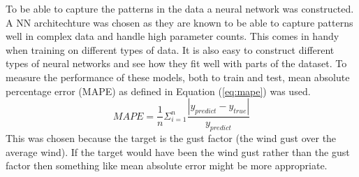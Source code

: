 To be able to capture the patterns in the data a neural network was constructed. A NN architechture was chosen as they are known to be able to capture patterns well in complex data and handle high parameter counts. This comes in handy when training on different types of data. It is also easy to construct different types of neural networks and see how they fit well with parts of the dataset. To measure the performance of these models, both to train and test, mean absolute percentage error (MAPE) as defined in Equation (\ref{eq:mape}) was used.
\begin{equation}
    \label{eq:mape}
    MAPE = \frac{1}{n}\Sigma_{i=1}^n\frac{|y_{predict} - y_{true}|}{y_{predict}}
\end{equation}
This was chosen because the target is the gust factor (the wind gust over the average wind). If the target would have been the wind gust rather than the gust factor then something like mean absolute error might be more appropriate.